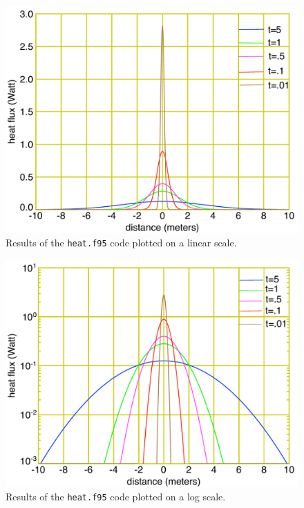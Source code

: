 \documentclass[12pt]{article}
\begin{document}
\begin{figure}[!htb]
\includegraphics[width=1.\textwidth]{stufflinear.pdf}
\caption{Results of the {\tt heat.f95} code plotted on a linear scale. }
\label{linearscattering}
\end{figure}

\begin{figure}[!htb]
\includegraphics[width=1.\textwidth]{stufflog.pdf}
\caption{Results of the {\tt heat.f95} code plotted on a log scale. }
\label{logscattering}
\end{figure}
\end{document}
